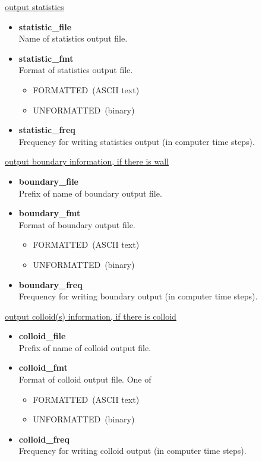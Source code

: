 \documentclass[a4paper,10pt]{article}
\begin{document}
\begin{center}
\underline{\textlangle output statistics \textrangle}
\end{center}

\begin{itemize}
\item  \textbf{statistic\_file} \\
Name of statistics output file.
\item \textbf{statistic\_fmt}\\
Format of statistics output file.
\begin{itemize}
 \item 
FORMATTED~(ASCII text)
\item
UNFORMATTED~(binary)
\end{itemize}

\item \textbf{statistic\_freq} \\
Frequency for writing statistics output
(in computer time steps).
\end{itemize}


\begin{center}
\underline{\textlangle output boundary information, if there is wall\textrangle}
\end{center}


\begin{itemize}
\item \textbf{boundary\_file }\\
Prefix of name of boundary output file.
\item  \textbf{boundary\_fmt} \\
Format of boundary output file. 
\begin{itemize}
 \item 
FORMATTED~(ASCII text)
\item
UNFORMATTED~(binary)
\end{itemize}
\item \textbf{boundary\_freq}\\
Frequency for writing boundary output
(in computer time steps).
\end{itemize}

\begin{center}
\underline{\textlangle output colloid(s) information, if there is colloid\textrangle}
\end{center}

\begin{itemize}
\item \textbf{colloid\_file} \\
Prefix of name of colloid output file.
\item  \textbf{colloid\_fmt} \\
Format of colloid output file. One of
\begin{itemize}
 \item 
FORMATTED~(ASCII text)
\item
UNFORMATTED~(binary)
\end{itemize}
\item \textbf{colloid\_freq} \\
Frequency for writing colloid output
(in computer time steps).
\end{itemize}
\end{document}
